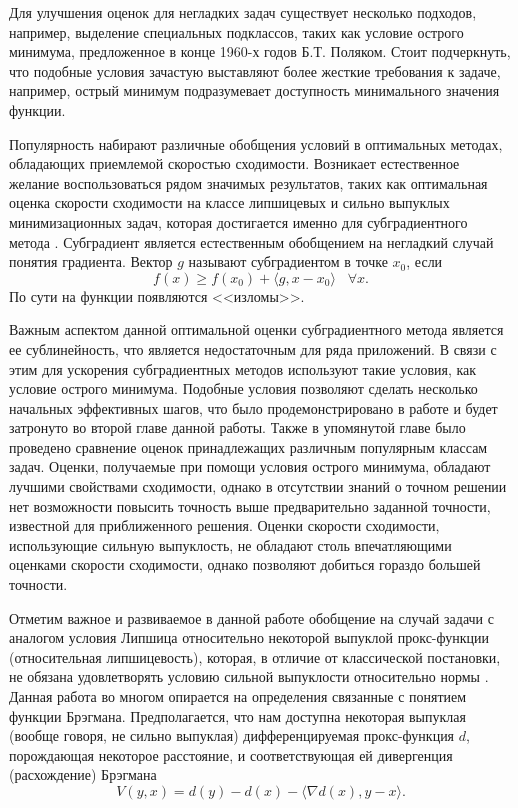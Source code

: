 Для улучшения оценок для негладких задач существует несколько подходов, например, выделение специальных подклассов, таких как условие острого минимума, предложенное в конце 1960-х годов Б.Т. Поляком. Стоит подчеркнуть, что подобные условия зачастую выставляют более жесткие требования к задаче, например, острый минимум подразумевает доступность минимального значения функции. 

Популярность набирают различные обобщения условий в оптимальных методах, обладающих приемлемой скоростью сходимости. Возникает естественное желание воспользоваться рядом значимых результатов, таких как оптимальная оценка скорости сходимости на классе липшицевых и сильно выпуклых минимизационных задач, которая достигается именно для субградиентного метода \cite{Bach_2012}. Субградиент является естественным обобщением на негладкий случай понятия градиента. Вектор $g$ называют субградиентом в точке $x_0$, если
$$
    f(x) \geq f(x_0) + \langle g, x - x_0 \rangle \;\;\; \forall x.
$$
По сути на функции появляются <<изломы>>.

Важным аспектом данной оптимальной оценки субградиентного метода является ее сублинейность, что является недостаточным для ряда приложений. В связи с этим для ускорения субградиентных методов используют такие условия, как условие острого минимума. Подобные условия позволяют сделать несколько начальных эффективных шагов, что было продемонстрировано в работе \cite{sharp22} и будет затронуто во второй главе данной работы. Также в упомянутой главе было проведено сравнение оценок принадлежащих различным популярным классам задач. Оценки, получаемые при помощи условия острого минимума, обладают лучшими свойствами сходимости, однако в отсутствии знаний о точном решении нет возможности повысить точность выше предварительно заданной точности, известной для приближенного решения. Оценки скорости сходимости, использующие сильную выпуклость, не обладают столь впечатляющими оценками скорости сходимости, однако позволяют добиться гораздо большей точности. 

Отметим важное и развиваемое в данной работе обобщение на случай задачи с аналогом условия Липшица относительно некоторой выпуклой прокс-функции (относительная липшицевость), которая, в отличие от классической постановки, не обязана удовлетворять условию сильной выпуклости относительно нормы \cite{AdaMirr_2021,Lu_2018,Zhou_NIPS_2020}. Данная работа во многом опирается на определения связанные с понятием функции Брэгмана. Предполагается, что нам доступна некоторая выпуклая (вообще говоря, не сильно выпуклая) дифференцируемая прокс-функция $d$, порождающая некоторое расстояние, и соответствующая ей дивергенция (расхождение) Брэгмана \cite{Bauschke}
\[
    V(y, x) = d(y) - d(x) - \langle \nabla d(x), y - x \rangle.
\]


